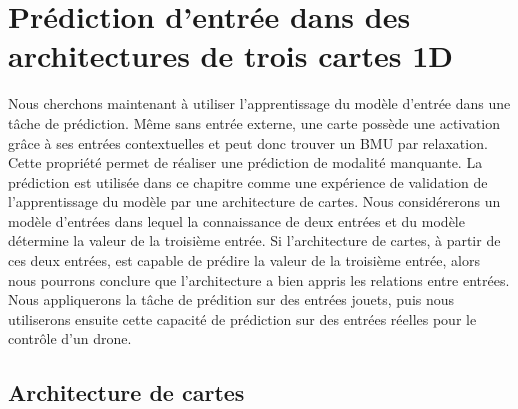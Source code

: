 \documentclass[../main]{subfiles}
\begin{document}
\section{Prédiction d'entrée dans des architectures de trois cartes 1D}


Nous cherchons maintenant à utiliser l'apprentissage du modèle d'entrée dans une tâche de prédiction. Même sans entrée externe, une carte possède une activation grâce à ses entrées contextuelles et peut donc trouver un BMU par relaxation. Cette propriété permet de réaliser une prédiction de modalité manquante. 
La prédiction est utilisée dans ce chapitre comme une expérience de validation de l'apprentissage du modèle par une architecture de cartes.
Nous considérerons un modèle d'entrées dans lequel la connaissance de deux entrées et du modèle détermine la valeur de la troisième entrée. Si l'architecture de cartes, à partir de ces deux entrées, est capable de prédire la valeur de la troisième entrée, alors nous pourrons conclure que l'architecture a bien appris les relations entre entrées.
Nous appliquerons la tâche de prédition sur des entrées jouets, puis nous utiliserons ensuite cette capacité de prédiction sur des entrées réelles pour le contrôle d'un drone.

\subsection{Architecture de cartes}
\end{document}
